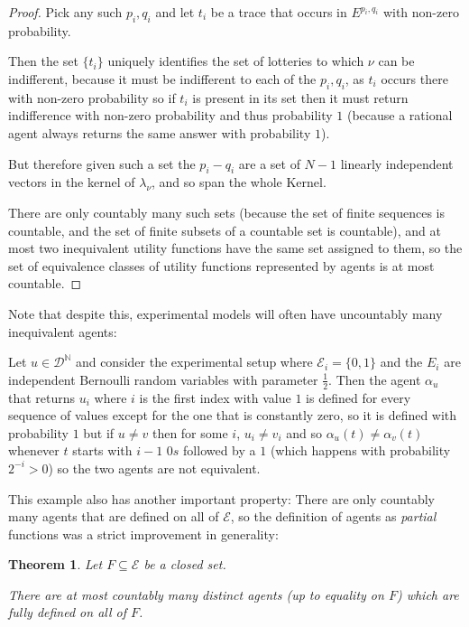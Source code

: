 \documentclass[a4paper]{book}
\newtheorem{theorem}{Theorem}[section]
\begin{document}
\begin{proof}
Pick any such $p_i, q_i$ and let $t_i$ be a trace that occurs in $E^{p_i, q_i}$
with non-zero probability.

Then the set $\{t_i\}$ uniquely identifies the set of lotteries to which
$\nu$ can be indifferent, because it must be indifferent to each of the $p_i, q_i$,
as $t_i$ occurs there with non-zero probability so if $t_i$ is present
in its set then it must return indifference with non-zero probability and
thus probability $1$ (because a rational agent always returns the same
answer with probability $1$).

But therefore given such a set the $p_i - q_i$ are a set of $N - 1$ linearly
independent vectors in the kernel of $\lambda_\nu$, and so span the whole Kernel.

There are only countably many such sets (because the set of finite sequences is
countable, and the set of finite subsets of a countable set is countable), and
at most two inequivalent utility functions have the same set assigned to them,
so the set of equivalence classes of utility functions represented by agents
is at most countable.

\end{proof}

Note that despite this, experimental models will often have uncountably many
inequivalent agents:

Let $u \in \mathcal{D}^\mathbb{N}$
and consider the experimental setup where
$\mathcal{E}_i = \{0, 1\}$
and the $E_i$
are independent Bernoulli random
variables with parameter $\frac{1}{2}$.
Then the agent $\alpha_u$
that returns $u_i$
where $i$
is the first index with value $1$
is defined for every sequence of values except for the one that is
constantly zero, so it is defined with probability $1$
but if $u \neq v$
then for some $i$,
$u_i \neq v_i$
and so $\alpha_u(t) \neq \alpha_v(t)$
whenever $t$
starts with $i - 1$
$0s$
followed by a $1$
(which happens with probability $2^{-i} > 0$)
so the two agents are not equivalent.

This example also has another important property: There are only countably
many agents that are defined on all of $\mathcal{E}$,
so the definition of agents as \textit{partial} functions was a strict
improvement in generality:

\begin{theorem}
Let $F \subseteq \mathcal{E}$
be a closed set.

There are at most countably many distinct agents (up to equality on $F$)
which are fully defined on all of $F$.
\end{theorem}
\end{document}
